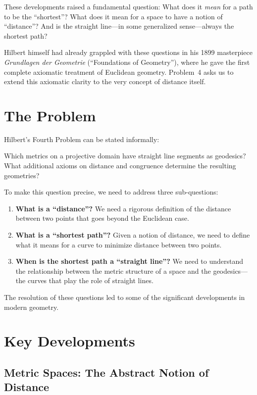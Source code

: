 These developments raised a fundamental question: What does it \emph{mean} for a path to be the ``shortest''? What does it mean for a space to have a notion of ``distance''? And is the straight line---in some generalized sense---always the shortest path?

Hilbert himself had already grappled with these questions in his 1899 masterpiece \emph{Grundlagen der Geometrie} (``Foundations of Geometry''), where he gave the first complete axiomatic treatment of Euclidean geometry. Problem~4 asks us to extend this axiomatic clarity to the very concept of distance itself.

\section{The Problem}

Hilbert's Fourth Problem can be stated informally:

\begin{problem_statement}
Which metrics on a projective domain have straight line segments as geodesics? What additional axioms on distance and congruence determine the resulting geometries?
\end{problem_statement}

To make this question precise, we need to address three sub-questions:
\begin{enumerate}
    \item \textbf{What is a ``distance''?} We need a rigorous definition of the distance between two points that goes beyond the Euclidean case.
    \item \textbf{What is a ``shortest path''?} Given a notion of distance, we need to define what it means for a curve to minimize distance between two points.
    \item \textbf{When is the shortest path a ``straight line''?} We need to understand the relationship between the metric structure of a space and the geodesics---the curves that play the role of straight lines.
\end{enumerate}
The resolution of these questions led to some of the significant developments in modern geometry.

\section{Key Developments}

\subsection{Metric Spaces: The Abstract Notion of Distance}

